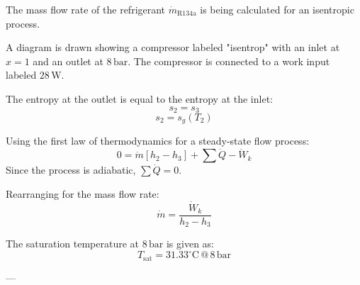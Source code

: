 The mass flow rate of the refrigerant \( \dot{m}_{\text{R134a}} \) is being calculated for an isentropic process.  

A diagram is drawn showing a compressor labeled "isentrop" with an inlet at \( x = 1 \) and an outlet at \( 8 \, \text{bar} \). The compressor is connected to a work input labeled \( 28 \, \text{W} \).  

The entropy at the outlet is equal to the entropy at the inlet:  
\[
s_2 = s_3
\]  
\[
s_2 = s_g(T_2)
\]  

Using the first law of thermodynamics for a steady-state flow process:  
\[
0 = \dot{m} [h_2 - h_3] + \sum \dot{Q} - \dot{W}_k
\]  
Since the process is adiabatic, \( \sum \dot{Q} = 0 \).  

Rearranging for the mass flow rate:  
\[
\dot{m} = \frac{\dot{W}_k}{h_2 - h_3}
\]  

The saturation temperature at \( 8 \, \text{bar} \) is given as:  
\[
T_{\text{sat}} = 31.33^\circ \text{C} \, @ \, 8 \, \text{bar}
\]  

---